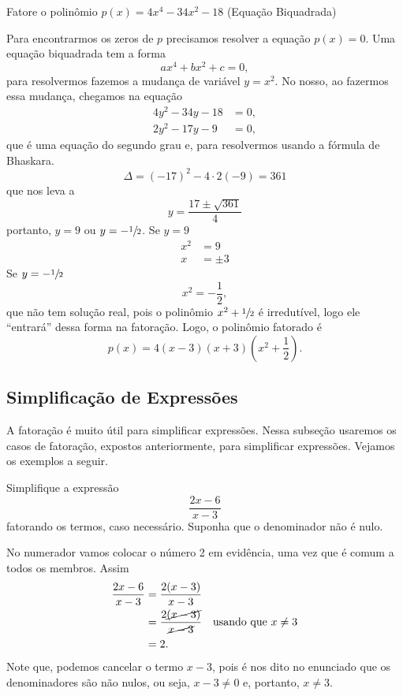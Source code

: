 \begin{example}
  Fatore o polinômio
  \(
    p(x) = 4x^4 - 34x^2 - 18
  \)
 (Equação Biquadrada)

  \solution
  Para encontrarmos os zeros de $p$ precisamos resolver a equação $p(x)=0$.
  Uma equação biquadrada tem a forma
  \[
    ax^4 + bx^2 + c = 0,
  \]
  para resolvermos fazemos a mudança de variável $y=x^2$.
  No nosso, ao fazermos essa mudança, chegamos na
  equação
  \begin{align*}
    4y^2 - 34y - 18 & = 0, \\
    2y^2 - 17y - 9  & = 0,
  \end{align*}
  que é uma equação do segundo
  grau e, para resolvermos usando  a fórmula de Bhaskara.
  \[
    \Delta = (-17)^2 - 4 \cdot 2(-9) = 361
  \]
  que nos leva a
  \[
    y = \frac{17 \pm \sqrt{361}}{4}
  \]
  portanto, $y = 9$ ou $y=-\sfrac{1}{2}$.
  Se $y=9$
  \begin{align*}
    x^2 & = 9 \\
    x   & = \pm 3
  \end{align*}
  Se $y=-\sfrac{1}{2}$
  \[
    x^2 = -\frac{1}{2},
  \]
  que não tem solução real, pois o polinômio $x^2+\sfrac{1}{2}$
  é irredutível, logo ele ``entrará'' dessa forma na fatoração.
  Logo, o polinômio fatorado é
  \[
    p(x) = 4 (x-3) (x+3) \left(x^2+\frac{1}{2} \right).
  \]
\end{example}

\subsection{Simplificação de Expressões}

A fatoração é muito útil para simplificar expressões. Nessa subseção usaremos
os casos de fatoração, expostos anteriormente, para simplificar expressões.
Vejamos os exemplos a seguir.

\begin{example}
  Simplifique a expressão
  \[
    \frac{2x-6}{x-3}
  \]
  fatorando os termos, caso necessário.
  Suponha que o denominador não é nulo.

  \solution
  No numerador vamos colocar o número 2 em evidência, uma vez que é comum a
  todos os membros. Assim
  \begin{align*}
    \frac{2x-6}{x-3}
    & = \frac{2(x-3)}{x-3} \\
    & = \frac{2\cancel{(x-3)}}{\cancel{x-3}} &\text{usando que } x \neq 3 \\
    & = 2.
  \end{align*}
  Note que, podemos cancelar o termo $x-3$, pois é nos dito no enunciado que os
  denominadores são não nulos, ou seja, $x-3 \neq 0$ e, portanto, $x \neq 3$.
\end{example}

